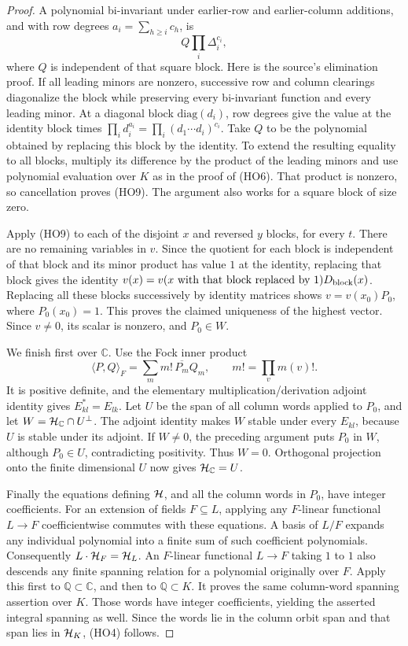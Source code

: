 \begin{proof}
A polynomial bi-invariant under earlier-row and
earlier-column additions, and with row degrees
\(a_i=\sum_{h\ge i}c_h\), is
\[
 Q\prod_i\Delta_i^{c_i},
 \tag{HO9}\label{eq:sr-source-leading-minor-factor}
\]
where \(Q\) is independent of that square block.
Here is the source's elimination proof.
If all leading minors are nonzero, successive row and
column clearings diagonalize the block while preserving
every bi-invariant function and every leading minor.
At a diagonal block \(\mathrm{diag}(d_i)\), row degrees
give the value at the identity block times
\(\prod_i d_i^{a_i}=\prod_i(d_1\cdots d_i)^{c_i}\).
Take \(Q\) to be the polynomial obtained by replacing
this block by the identity.  To extend the resulting
equality to all blocks, multiply its difference by the
product of the leading minors and use polynomial
evaluation over \(K\) as in the proof of (HO6).
That product is nonzero, so cancellation proves (HO9).
The argument also works for a square block of size zero.

Apply (HO9) to each of the disjoint \(x\) and reversed
\(y\) blocks, for every \(t\).  There are no remaining
variables in \(v\).
Since the quotient for each block is independent of that
block and its minor product has value \(1\) at the identity,
replacing that block gives the identity
\(v(x)=v(x\text{ with that block replaced by }1)D_{\rm block}(x)\).
Replacing all these blocks successively by identity
matrices shows
\(v=v(x_0)P_0\), where \(P_0(x_0)=1\).
This proves the claimed uniqueness of the highest vector.
Since \(v\ne0\), its scalar is nonzero, and \(P_0\in W\).

We finish first over \(\mathbb C\).
Use the Fock inner product
\[
  \langle P,Q\rangle_F=\sum_m m!\,\overline{P_m}Q_m,
       \qquad m!=\prod_v m(v)! .
\]
It is positive definite, and the elementary
multiplication/derivation adjoint identity gives
\(E_{kl}^*=E_{lk}\).
Let \(U\) be the span of all column words applied to
\(P_0\), and let \(W={\cal H}_{\mathbb C}\cap U^\perp\).
The adjoint identity makes \(W\) stable under every
\(E_{kl}\), because \(U\) is stable under its adjoint.
If \(W\ne0\), the preceding argument puts \(P_0\) in
\(W\), although \(P_0\in U\), contradicting positivity.
Thus \(W=0\).  Orthogonal projection onto the finite
dimensional \(U\) now gives \({\cal H}_{\mathbb C}=U\).

Finally the equations defining \({\cal H}\), and all the
column words in \(P_0\), have integer coefficients.
For an extension of fields \(F\subseteq L\), applying
any \(F\)-linear functional \(L\to F\) coefficientwise
commutes with these equations.  A basis of \(L/F\)
expands any individual polynomial into a finite sum
of such coefficient polynomials.
Consequently
\(L\cdot{\cal H}_F={\cal H}_L\).
An \(F\)-linear functional \(L\to F\) taking \(1\) to
\(1\) also descends any finite spanning relation for
a polynomial originally over \(F\).
Apply this first to \(\mathbb Q\subset\mathbb C\), and
then to \(\mathbb Q\subset K\).  It proves the same
column-word spanning assertion over \(K\).
Those words have integer coefficients, yielding
the asserted integral spanning as well.
Since the words lie in the column orbit span and
that span lies in \({\cal H}_K\), (HO4) follows.
\end{proof}

